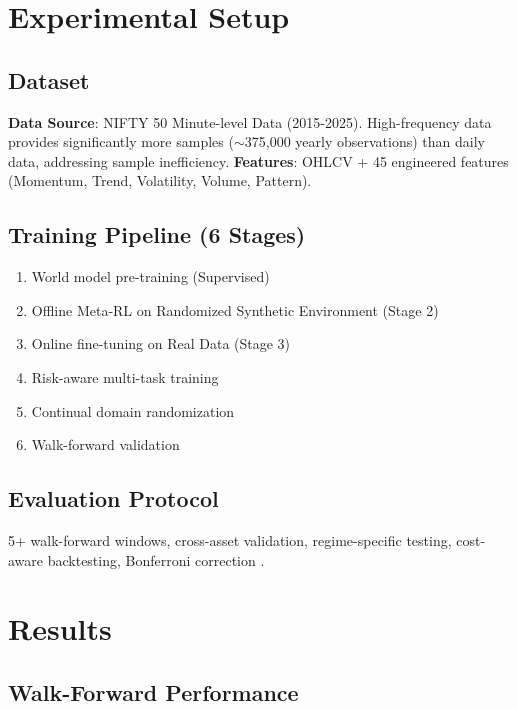 \documentclass[11pt]{article}
\begin{document}
\section{Experimental Setup}

\subsection{Dataset}
\textbf{Data Source}: NIFTY 50 Minute-level Data (2015-2025). High-frequency data provides significantly more samples ($\sim$375,000 yearly observations) than daily data, addressing sample inefficiency.
\textbf{Features}: OHLCV + 45 engineered features (Momentum, Trend, Volatility, Volume, Pattern).

\subsection{Training Pipeline (6 Stages)}
\begin{enumerate}
    \item World model pre-training (Supervised)
    \item Offline Meta-RL on Randomized Synthetic Environment (Stage 2)
    \item Online fine-tuning on Real Data (Stage 3)
    \item Risk-aware multi-task training
    \item Continual domain randomization
    \item Walk-forward validation
\end{enumerate}

\subsection{Evaluation Protocol}
5+ walk-forward windows, cross-asset validation, regime-specific testing, cost-aware backtesting, Bonferroni correction \citep{deprado2018advances}.

\section{Results}

\subsection{Walk-Forward Performance}
\end{document}
